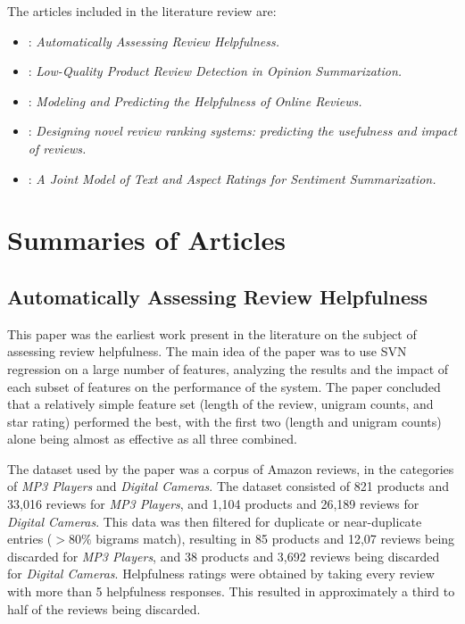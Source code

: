 \documentclass[12pt,letterpaper]{article}
\begin{document}
The articles included in the literature review are:

\begin{itemize}
	\item {}: {\em Automatically Assessing Review Helpfulness.}
	\item {}: {\em Low-Quality Product Review Detection in Opinion Summarization.}
	\item {}: {\em Modeling and Predicting the Helpfulness of Online Reviews.}
	\item {}: {\em Designing novel review ranking systems: predicting the usefulness and impact of reviews.}
	\item {}: {\em A Joint Model of Text and Aspect Ratings for Sentiment Summarization.}
\end{itemize}

\section{Summaries of Articles}
\subsection{Automatically Assessing Review Helpfulness \cite{2006kim-helpfulness}}
This paper was the earliest work present in the literature on the subject of assessing review helpfulness.
The main idea of the paper was to use SVN regression on a large number of features,
	analyzing the results and the impact of each subset of features on the performance
	of the system.
The paper concluded that a relatively simple feature set (length of the review,
	unigram counts, and star rating) performed the best, with the first two
	(length and unigram counts) alone being almost as effective as all three
	combined.

The dataset used by the paper was a corpus of Amazon reviews, in the categories
	of {\em MP3 Players} and {\em Digital Cameras}.
The dataset consisted of 821 products and 33,016 reviews for {\em MP3 Players},
	and 1,104 products and 26,189 reviews for {\em Digital Cameras}.
This data was then filtered for duplicate or near-duplicate entries ($>80\%$ bigrams match),
	resulting in 85 products and 12,07 reviews being discarded for {\em MP3 Players},
	and 38 products and 3,692 reviews being discarded for {\em Digital Cameras}.
Helpfulness ratings were obtained by taking every review with more than 5 helpfulness
	responses.
This resulted in approximately a third to half of the reviews being discarded.
\end{document}
